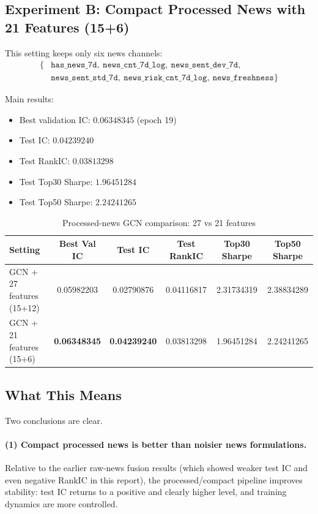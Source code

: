 \subsection{Experiment B: Compact Processed News with 21 Features (15+6)}

This setting keeps only six news channels:
\begin{align*}
\{&\texttt{has\_news\_7d},\ \texttt{news\_cnt\_7d\_log},\ \texttt{news\_sent\_dev\_7d},\\
&\texttt{news\_sent\_std\_7d},\ \texttt{news\_risk\_cnt\_7d\_log},\ \texttt{news\_freshness}\}
\end{align*}

Main results:
\begin{itemize}
\item Best validation IC: $0.06348345$ (epoch 19)
\item Test IC: $0.04239240$
\item Test RankIC: $0.03813298$
\item Test Top30 Sharpe: $1.96451284$
\item Test Top50 Sharpe: $2.24241265$
\end{itemize}

\begin{table}[htbp]
\centering
\caption{Processed-news GCN comparison: 27 vs 21 features}
\label{tab:gcn-processed-news-27-vs-21}
\begin{tabular}{lccccc}
\hline
Setting & Best Val IC & Test IC & Test RankIC & Top30 Sharpe & Top50 Sharpe \\
\hline
GCN + 27 features (15+12) & 0.05982203 & 0.02790876 & 0.04116817 & 2.31734319 & 2.38834289 \\
GCN + 21 features (15+6) & \textbf{0.06348345} & \textbf{0.04239240} & 0.03813298 & 1.96451284 & 2.24241265 \\
\hline
\end{tabular}
\end{table}

\subsection{What This Means}

Two conclusions are clear.

\paragraph{(1) Compact processed news is better than noisier news formulations.}
Relative to the earlier raw-news fusion results (which showed weaker test IC and even negative RankIC in this report), the processed/compact pipeline improves stability: test IC returns to a positive and clearly higher level, and training dynamics are more controlled.

